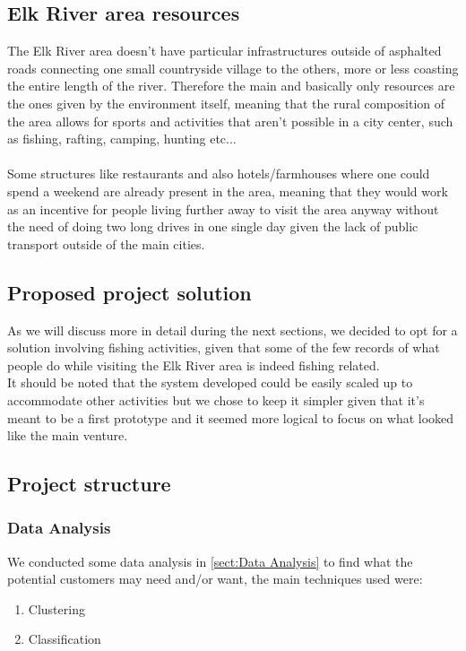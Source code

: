 

\subsection{Elk River area resources}
The Elk River area doesn't have particular infrastructures outside of asphalted roads connecting one small countryside village to the others, more or less coasting the entire length of the river. Therefore the main and basically only resources are the ones given by the environment itself, meaning that the rural composition of the area allows for sports and activities that aren't possible in a city center, such as fishing, rafting, camping, hunting etc...\\\\
Some structures like restaurants and also hotels/farmhouses where one could spend a weekend are already present in the area, meaning that they would work as an incentive for people living further away to visit the area anyway without the need of doing two long drives in one single day given the lack of public transport outside of the main cities.
\subsection{Proposed project solution}
As we will discuss more in detail during the next sections, we decided to opt for a solution involving fishing activities, given that some of the few records of what people do while visiting the Elk River area is indeed fishing related.\\
It should be noted that the system developed could be easily scaled up to accommodate other activities but we chose to keep it simpler given that it's meant to be a first prototype and it seemed more logical to focus on what looked like the main venture.
\subsection{Project structure}
\subsubsection{Data Analysis}
We conducted some data analysis in \autoref{sect:Data Analysis} to find what the potential customers may need and/or want, the main techniques used were:
\begin{enumerate}
\item Clustering
\item Classification
\end{enumerate}
